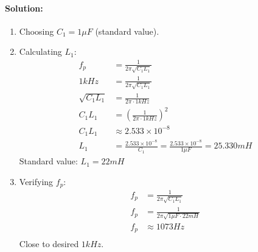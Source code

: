 \paragraph{Solution:}
\begin{enumerate}
  \item Choosing \(C_1 = 1 \mu F\) (standard value).
  \item Calculating \(L_1\):
    \begin{align*}
      f_p &= \frac{1}{2 \pi \sqrt{C_1L_1}} \\
      1 kHz &= \frac{1}{2 \pi \sqrt{C_1L_1}} \\
      \sqrt{C_1L_1} &= \frac{1}{2 \pi \cdot 1 kHz} \\
      C_1L_1 &= \left( \frac{1}{2 \pi \cdot 1 kHz} \right)^2 \\
      C_1L_1 &\approx 2.533 \times 10^{-8} \\
      L_1 &= \frac{2.533 \times 10^{-8}}{C_1} = \frac{2.533 \times 10^{-8}}{1 \mu F} = 25.330 mH
    \end{align*}
    Standard value: \(L_1 = 22 mH\)
  \item Verifying \(f_p\):
    \begin{align*}
      f_p &= \frac{1}{2 \pi \sqrt{C_1L_1}} \\
      f_p &= \frac{1}{2 \pi \sqrt{1 \mu F \cdot 22 mH}} \\
      f_p &\approx 1073 Hz \\
    \end{align*}
    Close to desired \(1 kHz\).
\end{enumerate}
